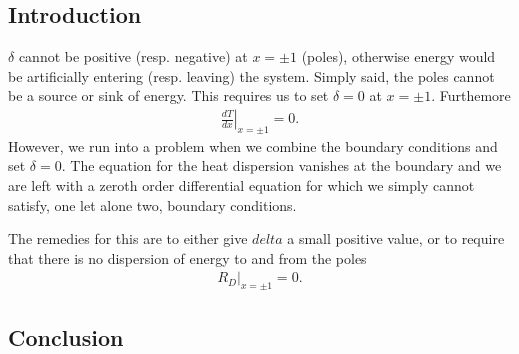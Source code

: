 \subsection{Introduction}
$\delta$ cannot be positive (resp. negative) at $x = \pm 1$ (poles), otherwise energy would be
artificially entering (resp. leaving) the system. Simply said, the poles cannot be a source or sink of energy.
This requires us to set $\delta = 0$ at $x = \pm 1$. Furthemore 
\begin{align*}
        \left.\frac{d T}{dx}\right|_{x = \pm 1} = 0.
\label{eq:bcs}
\end{align*}
However, we run into a problem when we combine the boundary conditions and set $\delta = 0$. The 
equation for the heat dispersion vanishes at the boundary and we are left with a zeroth order differential equation 
for which we simply cannot satisfy, one let alone two, boundary conditions.

The remedies for this are to either give $delta$ a small positive value, or to require that there is no
dispersion of energy to and from the poles
\begin{align*}
    \left.R_D\right|_{x = \pm 1} = 0.
\end{align*}
\subsection{Conclusion}